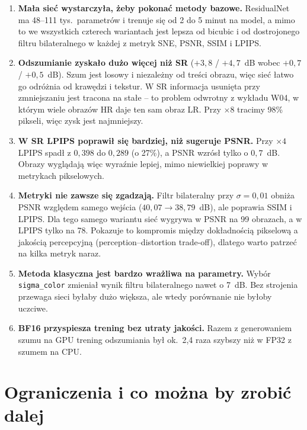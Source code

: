 \documentclass[11pt,a4paper]{article}
\newcommand{\code}[1]{\texttt{\mdseries #1}}
\newcommand{\nazwa}{ResidualNet}
\begin{document}
\begin{enumerate}
  \item \textbf{Mała sieć wystarczyła, żeby pokonać metody bazowe.} \nazwa{} ma 48--111 tys.\ parametrów
        i trenuje się od 2 do 5 minut na model, a mimo to we wszystkich czterech wariantach jest lepsza od bicubic
        i od dostrojonego filtru bilateralnego w każdej z metryk SNE, PSNR, SSIM i LPIPS.
  \item \textbf{Odszumianie zyskało dużo więcej niż SR} ($+3{,}8$ / $+4{,}7$~dB wobec $+0{,}7$ / $+0{,}5$~dB).
        Szum jest losowy i niezależny od treści obrazu, więc sieć łatwo go odróżnia od krawędzi i tekstur.
        W SR informacja usunięta przy zmniejszaniu jest tracona na stałe -- to problem odwrotny z wykładu W04,
        w którym wiele obrazów HR daje ten sam obraz LR. Przy $\times8$ tracimy 98\% pikseli, więc zysk jest najmniejszy.
  \item \textbf{W SR LPIPS poprawił się bardziej, niż sugeruje PSNR.} Przy $\times4$ LPIPS spadł z $0{,}398$ do
        $0{,}289$ (o 27\%), a PSNR wzrósł tylko o $0{,}7$~dB. Obrazy wyglądają więc wyraźnie lepiej, mimo
        niewielkiej poprawy w metrykach pikselowych.
  \item \textbf{Metryki nie zawsze się zgadzają.} Filtr bilateralny przy $\sigma=0{,}01$ obniża PSNR względem
        samego wejścia ($40{,}07\to38{,}79$~dB), ale poprawia SSIM i LPIPS. Dla tego samego wariantu sieć wygrywa
        w PSNR na 99 obrazach, a w LPIPS tylko na 78. Pokazuje to kompromis między dokładnością pikselową a jakością
        percepcyjną (perception--distortion trade-off), dlatego warto patrzeć na kilka metryk naraz.
  \item \textbf{Metoda klasyczna jest bardzo wrażliwa na parametry.} Wybór \code{sigma\_color} zmieniał wynik
        filtru bilateralnego nawet o 7~dB. Bez strojenia przewaga sieci byłaby dużo większa, ale wtedy porównanie
        nie byłoby uczciwe.
  \item \textbf{BF16 przyspiesza trening bez utraty jakości.} Razem z generowaniem szumu na GPU trening odszumiania
        był ok.\ 2,4 raza szybszy niż w FP32 z szumem na CPU.
\end{enumerate}

\section{Ograniczenia i co można by zrobić dalej}\label{sec:ograniczenia}
\end{document}
